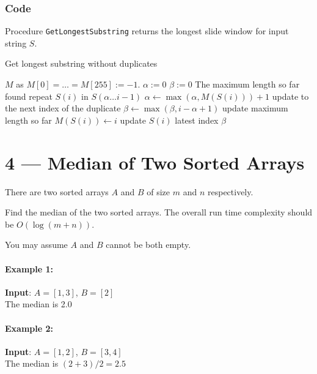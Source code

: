 \subsubsection{Code}
Procedure \texttt{GetLongestSubstring} returns the longest slide window for input string $S$.
\begin{algorithm}[H]
\caption{Get longest substring without duplicates}
\begin{algorithmic}[1]
\State $M$ as $M[0]=\ldots=M[255]:=-1$.
\State $\alpha := 0 $
\State $\beta := 0$ \Comment The maximum length so far
 \Comment found repeat $S(i)$ in $S(\alpha\ldots i-1)$
\State $\alpha \gets \max(\alpha, M(S(i))) + 1$ \Comment update to the next index of the duplicate
\EndIf
\State $\beta \gets \max(\beta, i - \alpha +1 )$ \Comment update maximum length so far
\State $M(S(i)) \gets i$ \Comment update $S(i)$ latest index
\EndFor
\State \Return $\beta$
\EndProcedure
\end{algorithmic}
\end{algorithm}

\section{4 --- Median of Two Sorted Arrays}
There are two sorted arrays $A$ and $B$ of size $m$ and $n$ respectively.
\par
Find the median of the two sorted arrays. The overall run time complexity should be $O(\log (m+n))$.
\par
You may assume $A$ and $B$ cannot be both empty.
\paragraph{Example 1:}
\begin{flushleft}
\textbf{Input}: $A = [1, 3]$, $B = [2]$
\\
The median is 2.0
\end{flushleft}
\paragraph{Example 2:}
\begin{flushleft}
\textbf{Input}: $A = [1, 2]$, $B = [3, 4]$
\\
The median is $(2 + 3)/2 = 2.5$
\end{flushleft}
